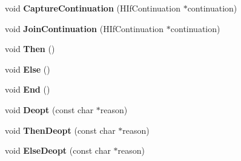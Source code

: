 \begin{DoxyCompactItemize}
\item 
\hypertarget{classv8_1_1internal_1_1_h_graph_builder_1_1_v8___f_i_n_a_l_aa259ce5f65b6db8cc338c0f4691ba72e}{}void {\bfseries Capture\+Continuation} (H\+If\+Continuation $\ast$continuation)\label{classv8_1_1internal_1_1_h_graph_builder_1_1_v8___f_i_n_a_l_aa259ce5f65b6db8cc338c0f4691ba72e}

\item 
\hypertarget{classv8_1_1internal_1_1_h_graph_builder_1_1_v8___f_i_n_a_l_a3f961617985d218ef1dc41179dcceeea}{}void {\bfseries Join\+Continuation} (H\+If\+Continuation $\ast$continuation)\label{classv8_1_1internal_1_1_h_graph_builder_1_1_v8___f_i_n_a_l_a3f961617985d218ef1dc41179dcceeea}

\item 
\hypertarget{classv8_1_1internal_1_1_h_graph_builder_1_1_v8___f_i_n_a_l_a719e5946cb1cb0c000f2f43de1d74f01}{}void {\bfseries Then} ()\label{classv8_1_1internal_1_1_h_graph_builder_1_1_v8___f_i_n_a_l_a719e5946cb1cb0c000f2f43de1d74f01}

\item 
\hypertarget{classv8_1_1internal_1_1_h_graph_builder_1_1_v8___f_i_n_a_l_acc95257a2fb3ced86b14c86267f6913b}{}void {\bfseries Else} ()\label{classv8_1_1internal_1_1_h_graph_builder_1_1_v8___f_i_n_a_l_acc95257a2fb3ced86b14c86267f6913b}

\item 
\hypertarget{classv8_1_1internal_1_1_h_graph_builder_1_1_v8___f_i_n_a_l_a2b89aff4ac9a7122a7417f19e9b13e0b}{}void {\bfseries End} ()\label{classv8_1_1internal_1_1_h_graph_builder_1_1_v8___f_i_n_a_l_a2b89aff4ac9a7122a7417f19e9b13e0b}

\item 
\hypertarget{classv8_1_1internal_1_1_h_graph_builder_1_1_v8___f_i_n_a_l_a32b54191b7f0cbf315599777cf93782b}{}void {\bfseries Deopt} (const char $\ast$reason)\label{classv8_1_1internal_1_1_h_graph_builder_1_1_v8___f_i_n_a_l_a32b54191b7f0cbf315599777cf93782b}

\item 
\hypertarget{classv8_1_1internal_1_1_h_graph_builder_1_1_v8___f_i_n_a_l_a3bfb2288078285a4a3c2747792c1cf54}{}void {\bfseries Then\+Deopt} (const char $\ast$reason)\label{classv8_1_1internal_1_1_h_graph_builder_1_1_v8___f_i_n_a_l_a3bfb2288078285a4a3c2747792c1cf54}

\item 
\hypertarget{classv8_1_1internal_1_1_h_graph_builder_1_1_v8___f_i_n_a_l_a9a4e9c1c5619e5c3afb9dcf7395c812c}{}void {\bfseries Else\+Deopt} (const char $\ast$reason)\label{classv8_1_1internal_1_1_h_graph_builder_1_1_v8___f_i_n_a_l_a9a4e9c1c5619e5c3afb9dcf7395c812c}


\end{DoxyCompactItemize}
